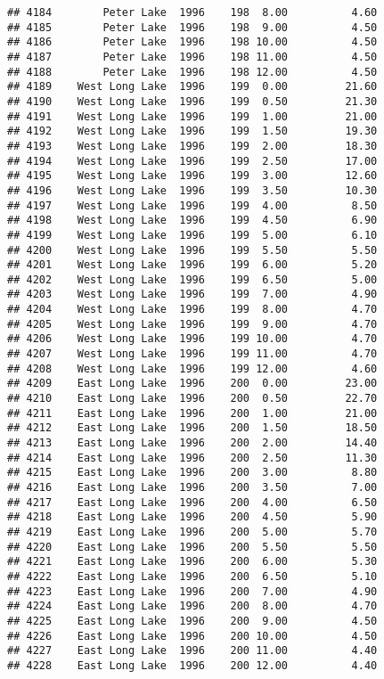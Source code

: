 \documentclass[
]{article}
\begin{document}
\begin{verbatim}
## 4184        Peter Lake  1996    198  8.00          4.60
## 4185        Peter Lake  1996    198  9.00          4.50
## 4186        Peter Lake  1996    198 10.00          4.50
## 4187        Peter Lake  1996    198 11.00          4.50
## 4188        Peter Lake  1996    198 12.00          4.50
## 4189    West Long Lake  1996    199  0.00         21.60
## 4190    West Long Lake  1996    199  0.50         21.30
## 4191    West Long Lake  1996    199  1.00         21.00
## 4192    West Long Lake  1996    199  1.50         19.30
## 4193    West Long Lake  1996    199  2.00         18.30
## 4194    West Long Lake  1996    199  2.50         17.00
## 4195    West Long Lake  1996    199  3.00         12.60
## 4196    West Long Lake  1996    199  3.50         10.30
## 4197    West Long Lake  1996    199  4.00          8.50
## 4198    West Long Lake  1996    199  4.50          6.90
## 4199    West Long Lake  1996    199  5.00          6.10
## 4200    West Long Lake  1996    199  5.50          5.50
## 4201    West Long Lake  1996    199  6.00          5.20
## 4202    West Long Lake  1996    199  6.50          5.00
## 4203    West Long Lake  1996    199  7.00          4.90
## 4204    West Long Lake  1996    199  8.00          4.70
## 4205    West Long Lake  1996    199  9.00          4.70
## 4206    West Long Lake  1996    199 10.00          4.70
## 4207    West Long Lake  1996    199 11.00          4.70
## 4208    West Long Lake  1996    199 12.00          4.60
## 4209    East Long Lake  1996    200  0.00         23.00
## 4210    East Long Lake  1996    200  0.50         22.70
## 4211    East Long Lake  1996    200  1.00         21.00
## 4212    East Long Lake  1996    200  1.50         18.50
## 4213    East Long Lake  1996    200  2.00         14.40
## 4214    East Long Lake  1996    200  2.50         11.30
## 4215    East Long Lake  1996    200  3.00          8.80
## 4216    East Long Lake  1996    200  3.50          7.00
## 4217    East Long Lake  1996    200  4.00          6.50
## 4218    East Long Lake  1996    200  4.50          5.90
## 4219    East Long Lake  1996    200  5.00          5.70
## 4220    East Long Lake  1996    200  5.50          5.50
## 4221    East Long Lake  1996    200  6.00          5.30
## 4222    East Long Lake  1996    200  6.50          5.10
## 4223    East Long Lake  1996    200  7.00          4.90
## 4224    East Long Lake  1996    200  8.00          4.70
## 4225    East Long Lake  1996    200  9.00          4.50
## 4226    East Long Lake  1996    200 10.00          4.50
## 4227    East Long Lake  1996    200 11.00          4.40
## 4228    East Long Lake  1996    200 12.00          4.40

\end{verbatim}
\end{document}
